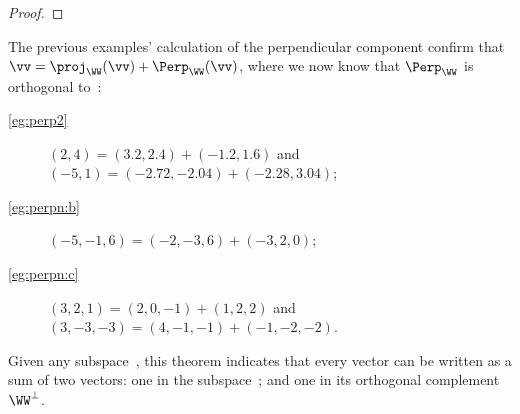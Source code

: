 \begin{proof}
%
\end{proof}


\begin{example} \label{eg:}
The previous examples' calculation of the perpendicular component confirm that \(\vv=\proj_\WW(\vv)+\Perp_\WW(\vv)\), where we now know that \(\Perp_\WW\) is orthogonal to~\WW:
\begin{description}
\item[\ref{eg:perp2}] \((2,4)=(3.2,2.4)+(-1.2,1.6)\) and 
\\\((-5,1)=(-2.72,-2.04)+(-2.28,3.04)\);
\item[\ref{eg:perpn:b}] \((-5,-1,6)=(-2,-3,6)+(-3,2,0)\);
\item[\ref{eg:perpn:c}] \((3,2,1)=(2,0,-1)+(1,2,2)\) and 
\\\((3,-3,-3)=(4,-1,-1)+(-1,-2,-2)\).
\end{description}
\end{example}

Given any subspace~\WW, this theorem indicates that every vector can be written as a sum of two vectors: one in the subspace~\WW; and one in its orthogonal complement~\(\WW^\perp\).


